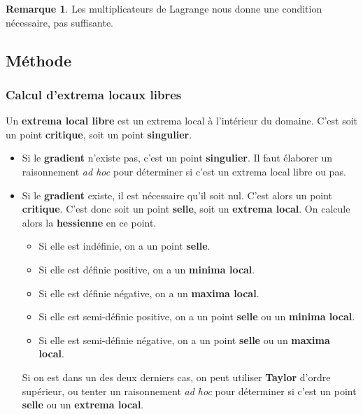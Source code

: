 \documentclass[11pt,a4paper]{article}
\theoremstyle{definition}
\newtheorem{myrem}[mydef]{Remarque}
\begin{document}
\begin{myrem}
	Les multiplicateurs de Lagrange nous donne une condition nécessaire, pas suffisante.
\end{myrem}

\subsection{Méthode}

\subsubsection{Calcul d'extrema locaux libres}
Un \textbf{extrema local libre} est un extrema local à l'intérieur du domaine.
C'est soit un point \textbf{critique}, soit un point \textbf{singulier}.
\begin{itemize}
	\item Si le \textbf{gradient} n'existe pas, c'est un point \textbf{singulier}.
		Il faut élaborer un raisonnement \emph{ad hoc} pour déterminer si c'est un extrema local libre ou pas.
	\item Si le \textbf{gradient} existe, il est nécessaire qu'il soit nul.
		C'est alors un point \textbf{critique}.
		C'est donc soit un point \textbf{selle}, soit un \textbf{extrema local}.
		On calcule alors la \textbf{hessienne} en ce point.
		\begin{itemize}
			\item Si elle est indéfinie, on a un point \textbf{selle}.
			\item Si elle est définie positive, on a un \textbf{minima local}.
			\item Si elle est définie négative, on a un \textbf{maxima local}.
			\item Si elle est semi-définie positive, on a un point \textbf{selle} ou un \textbf{minima local}.
			\item Si elle est semi-définie négative, on a un point \textbf{selle} ou un \textbf{maxima local}.
		\end{itemize}
		Si on est dans un des deux derniers cas, on peut utiliser \textbf{Taylor} d'ordre supérieur, ou tenter un raisonnement \emph{ad hoc} pour déterminer si c'est un point \textbf{selle} ou un \textbf{extrema local}.
\end{itemize}
\end{document}
